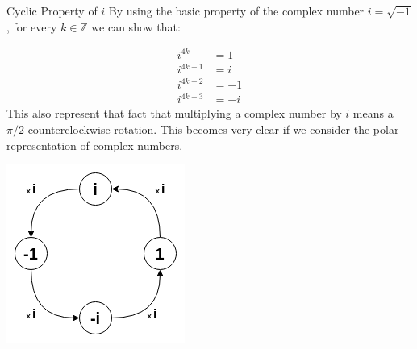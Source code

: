 \begin{example}{Cyclic Property of $i$}
By using the basic property of the complex number $i = \sqrt{-1}$, for every $k \in \mathbb{Z}$ we can show that:

\begin{align*}
i^{4k} &= 1 \\
i^{4k+1} &= i \\
i^{4k+2} &= -1 \\
i^{4k+3} &= -i
\end{align*}
This also represent that fact that multiplying a complex number by $i$ means a $\pi/2$ counterclockwise rotation. This becomes very clear if we consider the polar representation of complex numbers.

\centering
\includegraphics[scale=0.4]{Images/fig_CyclicProperty.png}

\end{example}



